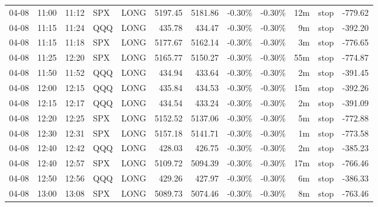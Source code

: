 \documentclass[11pt,a4paper,twoside]{article}
\begin{document}
\begin{center}
\begin{longtable}{>{\color{txtmain}}l l l l l r r r r r >{\color{txtmain}}l r}
04-08 & 11:00 & 11:12 & SPX & LONG & 5197.45 & 5181.86 & \textcolor{lossred}{-0.30\%} & \textcolor{lossred}{-0.30\%} & 12m & stop & \textcolor{lossred}{-779.62} \\
04-08 & 11:15 & 11:24 & QQQ & LONG & 435.78 & 434.47 & \textcolor{lossred}{-0.30\%} & \textcolor{lossred}{-0.30\%} & 9m & stop & \textcolor{lossred}{-392.20} \\
04-08 & 11:15 & 11:18 & SPX & LONG & 5177.67 & 5162.14 & \textcolor{lossred}{-0.30\%} & \textcolor{lossred}{-0.30\%} & 3m & stop & \textcolor{lossred}{-776.65} \\
04-08 & 11:25 & 12:20 & SPX & LONG & 5165.77 & 5150.27 & \textcolor{lossred}{-0.30\%} & \textcolor{lossred}{-0.30\%} & 55m & stop & \textcolor{lossred}{-774.87} \\
04-08 & 11:50 & 11:52 & QQQ & LONG & 434.94 & 433.64 & \textcolor{lossred}{-0.30\%} & \textcolor{lossred}{-0.30\%} & 2m & stop & \textcolor{lossred}{-391.45} \\
04-08 & 12:00 & 12:15 & QQQ & LONG & 435.84 & 434.53 & \textcolor{lossred}{-0.30\%} & \textcolor{lossred}{-0.30\%} & 15m & stop & \textcolor{lossred}{-392.26} \\
04-08 & 12:15 & 12:17 & QQQ & LONG & 434.54 & 433.24 & \textcolor{lossred}{-0.30\%} & \textcolor{lossred}{-0.30\%} & 2m & stop & \textcolor{lossred}{-391.09} \\
04-08 & 12:20 & 12:25 & SPX & LONG & 5152.52 & 5137.06 & \textcolor{lossred}{-0.30\%} & \textcolor{lossred}{-0.30\%} & 5m & stop & \textcolor{lossred}{-772.88} \\
04-08 & 12:30 & 12:31 & SPX & LONG & 5157.18 & 5141.71 & \textcolor{lossred}{-0.30\%} & \textcolor{lossred}{-0.30\%} & 1m & stop & \textcolor{lossred}{-773.58} \\
04-08 & 12:40 & 12:42 & QQQ & LONG & 428.03 & 426.75 & \textcolor{lossred}{-0.30\%} & \textcolor{lossred}{-0.30\%} & 2m & stop & \textcolor{lossred}{-385.23} \\
04-08 & 12:40 & 12:57 & SPX & LONG & 5109.72 & 5094.39 & \textcolor{lossred}{-0.30\%} & \textcolor{lossred}{-0.30\%} & 17m & stop & \textcolor{lossred}{-766.46} \\
04-08 & 12:50 & 12:56 & QQQ & LONG & 429.26 & 427.97 & \textcolor{lossred}{-0.30\%} & \textcolor{lossred}{-0.30\%} & 6m & stop & \textcolor{lossred}{-386.33} \\
04-08 & 13:00 & 13:08 & SPX & LONG & 5089.73 & 5074.46 & \textcolor{lossred}{-0.30\%} & \textcolor{lossred}{-0.30\%} & 8m & stop & \textcolor{lossred}{-763.46} \\

\end{longtable}
\end{center}
\end{document}
